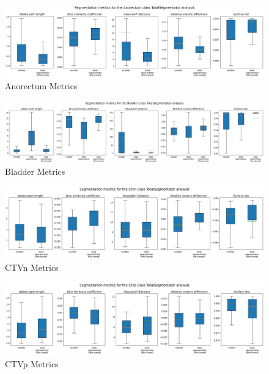 \documentclass[12pt,twoside]{report}
\begin{document}
\begin{landscape}

  \begin{figure}[H]
    \centering
    \includegraphics[width=\linewidth]{../../research/source/code/data/metrics/metricsanorectum_1_combinednotable_TotalSegmentator_analysis.png}
    \caption{Anorectum Metrics}\label{fig:totalsegmentator-metrics-anorectum}
  \end{figure}

  \begin{figure}[H]
    \centering
    \includegraphics[width=\linewidth]{../../research/source/code/data/metrics/metricsbladder_1_combinednotable_TotalSegmentator_analysis.png}
    \caption{Bladder Metrics}\label{fig:totalsegmentator-metrics-bladder}
  \end{figure}

  \begin{figure}[H]
    \centering
    \includegraphics[width=\linewidth]{../../research/source/code/data/metrics/metricsctvn_1_combinednotable_TotalSegmentator_analysis.png}
    \caption{CTVn Metrics}\label{fig:totalsegmentator-metrics-ctvn}
  \end{figure}

  \begin{figure}[H]
    \centering
    \includegraphics[width=\linewidth]{../../research/source/code/data/metrics/metricsctvp_1_combinednotable_TotalSegmentator_analysis.png}
    \caption{CTVp Metrics}\label{fig:totalsegmentator-metrics-ctvp}
  \end{figure}


\end{landscape}
\end{document}
